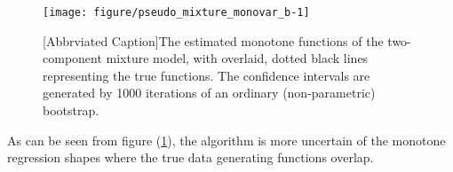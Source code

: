 \documentclass[10pt]{olplainarticle}\usepackage[]{graphicx}\usepackage[]{color}
\makeatletter
\def\maxwidth{ %
  \ifdim\Gin@nat@width>\linewidth
    \linewidth
  \else
    \Gin@nat@width
  \fi
}
\newenvironment{knitrout}{}{} %
\makeatother
\begin{document}
\begin{figure}[H]
\begin{knitrout}
\color{fgcolor}

{\centering \texttt{[image: figure/pseudo\_mixture\_monovar\_b-1]} 

}



\end{knitrout}
[Abbrviated Caption]{The estimated monotone functions of the two-component mixture model, with overlaid, dotted black lines representing the true functions. The confidence intervals are generated by 1000 iterations of an ordinary (non-parametric) bootstrap.} \label{fig:pseudo_mixture_monovar_b}
\end{figure}

% 
% 

As can be seen from figure (\ref{fig:pseudo_mixture_monovar_b}), the algorithm is more uncertain of the monotone regression shapes where the true data generating functions overlap. 
\end{document}
